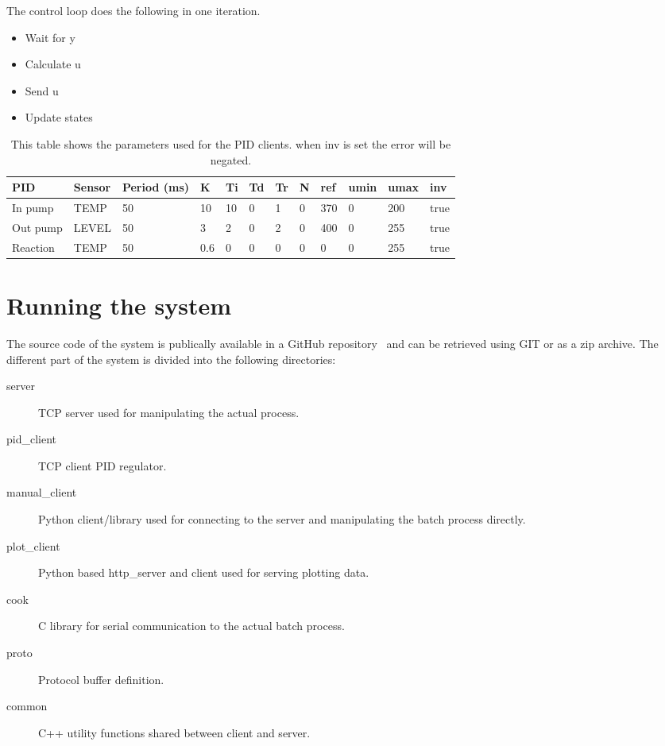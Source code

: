 \documentclass{article}
\begin{document}
The control loop does the following in one iteration.
\begin{itemize}
\item{Wait for y}
\item{Calculate u}
\item{Send u}
\item{Update states}
\end{itemize}

\begin{table}[H]
\begin{tabular}{|l|l|l|l|l|l|l|l|l|l|l|l|}
\hline
PID      & Sensor & Period (ms) & K & Ti & Td & Tr & N & ref & umin & umax & inv \\
\hline
In pump  & TEMP & 50 & 10 & 10 & 0 & 1 & 0 & 370 & 0 & 200 & true \\
\hline
Out pump & LEVEL & 50 & 3 & 2 & 0 & 2 & 0 & 400 & 0 & 255 & true \\
\hline
Reaction & TEMP & 50 & 0.6 & 0 & 0 & 0 & 0 & 0 & 0 & 255 & true \\
\hline
\end{tabular}
\caption{\small{This table shows the parameters used for the PID clients.
		 when inv is set the error will be negated.}}
\label{paramtable}
\end{table}

\section{Running the system}
The source code of the system is publically available in a GitHub
repository~\cite{repo} and can be retrieved using GIT or as a zip archive.
The different part of the system is divided into the following directories:
\begin{description}
\item[server]
  TCP server used for manipulating the actual process.
\item[pid\_client]
  TCP client PID regulator.
\item[manual\_client]
  Python client/library used for connecting to the server and manipulating the
  batch process directly.
\item[plot\_client]
  Python based http\_server and client used for serving plotting data.
\item[cook]
  C library for serial communication to the actual batch process.
\item[proto]
  Protocol buffer definition.
\item[common]
  C++ utility functions shared between client and server.
\end{description}
\end{document}
